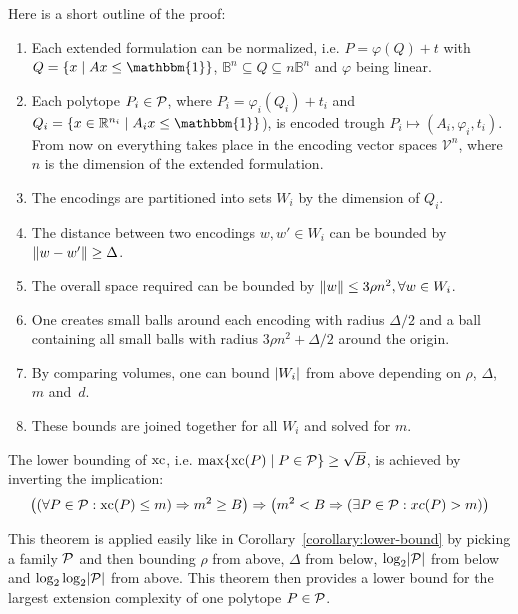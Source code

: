 Here is a short outline of the proof:
\begin{enumerate}
  \item Each extended formulation can be normalized, i.e. $P = \varphi(Q) + t$ with\\ $Q = \{ x \mid Ax \leq \mathbbm{1} \}$, $\mathbb{B}^n \subseteq Q \subseteq n\mathbb{B}^n$ and $\varphi$ being linear.
  \item Each polytope $P_i \in \P$, where $P_i = \varphi_i(Q_i) + t_i$ and $Q_i = \{ x \in \R^{n_i} \mid A_ix \leq \mathbbm{1} \}$), is encoded trough $P_i \mapsto (A_i, \varphi_i, t_i)$.\\
  From now on everything takes place in the encoding vector spaces $\mathcal{V}^n$, where $n$ is the dimension of the extended formulation.
  \item The encodings are partitioned into sets $W_i$ by the dimension of $Q_i$.
  \item The distance between two encodings $w, w' \in W_i$ can be bounded by $\norm{w - w'} \geq \Delta$.
  \item The overall space required can be bounded by $\norm{w} \leq 3\rho n^2, \forall w \in W_i$.
  \item One creates small balls around each encoding with radius $\Delta/2$ and a ball containing all small balls with radius $3\rho n^2 + \Delta/2$ around the origin.
  \item By comparing volumes, one can bound $\abs{W_i}$ from above depending on $\rho$, $\Delta$, $m$ and~$d$.
  \item These bounds are joined together for all $W_i$ and solved for $m$.
\end{enumerate}

The lower bounding of $\xc$, i.e. $\max \{\xc(P) \mid P \in \P\}  \geq \sqrt{B}$, is achieved by inverting the implication: 
$$ \left( \left( \forall P\in\P: \xc(P) \leq m \right) \Rightarrow m^2 \geq B \right) \Rightarrow \left( m^2 < B \Rightarrow \left( \exists P\in\P: xc(P) > m \right) \right) $$

This theorem is applied easily like in Corollary~\ref{corollary:lower-bound} by picking a family $\P$ and then bounding $\rho$ from above, $\Delta$ from below, $\log_2 \abs{\P}$ from below and $\log_2\log_2 \abs{\P}$ from above. This theorem then provides a lower bound for the largest extension complexity of one polytope $P \in \P$.
